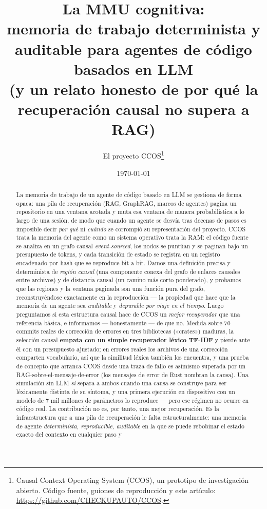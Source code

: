 \documentclass[11pt]{article}
\title{\textbf{La MMU cognitiva:\\ memoria de trabajo determinista y auditable para agentes de código basados en LLM\\ \large (y un relato honesto de por qué la recuperación causal no supera a RAG)}}
\author{El proyecto CCOS\thanks{Causal Context Operating System (CCOS), un prototipo
de investigación abierto. Código fuente, guiones de reproducción y este artículo:
\url{https://github.com/CHECKUPAUTO/CCOS}.}}
\date{\today}
\begin{document}
\maketitle

\begin{abstract}
La memoria de trabajo de un agente de código basado en LLM se gestiona de forma
opaca: una pila de recuperación (RAG, GraphRAG, marcos de agentes) pagina un
repositorio en una ventana acotada y muta esa ventana de manera probabilística a lo
largo de una sesión, de modo que cuando un agente se desvía tras decenas de pasos es
imposible decir \emph{por qué} ni \emph{cuándo} se corrompió su representación del
proyecto. CCOS trata la memoria del agente como un sistema operativo trata la RAM: el
código fuente se analiza en un grafo causal \emph{event-sourced}, los nodos se
puntúan y se paginan bajo un presupuesto de tokens, y cada transición de estado se
registra en un registro encadenado por hash que se reproduce bit a bit. Damos una
definición precisa y determinista de \emph{región causal} (una componente conexa del
grafo de enlaces causales entre archivos) y de distancia causal (un camino más corto
ponderado), y probamos que las regiones y la ventana paginada son una función pura
del grafo, reconstruyéndose exactamente en la reproducción --- la propiedad que hace
que la memoria de un agente sea \emph{auditable} y \emph{depurable por viaje en el
tiempo}. Luego preguntamos si esta estructura causal hace de CCOS un \emph{mejor
recuperador} que una referencia básica, e informamos --- honestamente --- de que no.
Medida sobre $70$ commits reales de corrección de errores en tres bibliotecas
(«crates») maduras, la selección causal \textbf{empata con un simple recuperador
léxico TF-IDF} y pierde ante él con un presupuesto ajustado; en errores reales los
archivos de una corrección comparten vocabulario, así que la similitud léxica también
los encuentra, y una prueba de concepto que arranca CCOS desde una traza de fallo es
asimismo superada por un RAG-sobre-el-mensaje-de-error (los mensajes de error de Rust
nombran la causa). Una simulación sin LLM \emph{sí} separa a ambos cuando una causa se
construye para ser léxicamente distinta de su síntoma, y una primera ejecución en
dispositivo con un modelo de $7$ mil millones de parámetros lo reproduce --- pero ese
régimen no ocurre en código real. La contribución no es, por tanto, una mejor
recuperación. Es la infraestructura que a una pila de recuperación le falta
estructuralmente: una memoria de agente \emph{determinista, reproducible, auditable}
en la que se puede rebobinar el estado exacto del contexto en cualquier paso y

\end{abstract}
\end{document}
